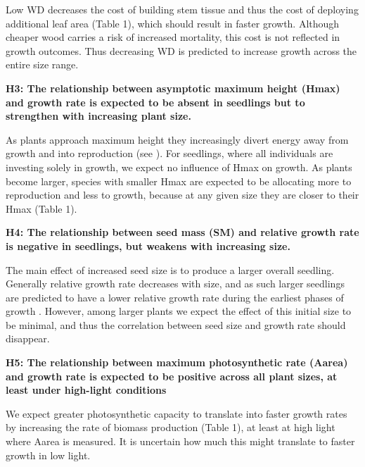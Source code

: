 \documentclass[a4paper]{article}\usepackage[]{graphicx}\usepackage[]{color}
\begin{document}
Low WD decreases the cost of building stem tissue and thus the cost of deploying additional leaf area (Table 1), which should result in faster growth. Although cheaper wood carries a risk of increased mortality, this cost is not reflected in growth outcomes. Thus decreasing WD is predicted to increase growth across the entire size range. 

\textbf{H3: The relationship between asymptotic maximum height (Hmax) and growth rate is expected to be absent in seedlings but to strengthen with increasing plant size.}

As plants approach maximum height they increasingly divert energy away from growth and into reproduction (see \citealt{Thomas:1996do, Falster:2011ii, Wenk:2014jz}). For seedlings, where all individuals are investing solely in growth, we expect no influence of Hmax on growth. As plants become larger, species with smaller Hmax are expected to be allocating more to reproduction and less to growth, because at any given size they are closer to their Hmax (Table 1). 

\textbf{H4: The relationship between seed mass (SM) and relative growth rate is negative in seedlings, but weakens with increasing size.}

The main effect of increased seed size is to produce a larger overall seedling. Generally relative growth rate decreases with size, and as such larger seedlings are predicted to have a lower relative growth rate during the earliest phases of growth \citet{Turnbull:2012ew}. However, among larger plants we expect the effect of this initial size to be minimal, and thus the correlation between seed size and growth rate should disappear.

\textbf{H5: The relationship between maximum photosynthetic rate (Aarea) and growth rate is expected to be positive across all plant sizes, at least under high-light conditions}

We expect greater photosynthetic capacity to translate into faster growth rates by increasing the rate of biomass production (Table 1), at least at high light where Aarea is measured. It is uncertain how much this might translate to faster growth in low light.
\end{document}

